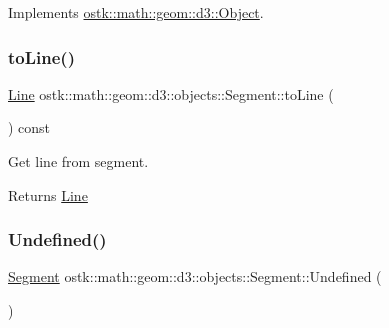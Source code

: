 Implements \hyperlink{classostk_1_1math_1_1geom_1_1d3_1_1_object_ab2a2a782503b97d1cecabdfedc636fce}{ostk\+::math\+::geom\+::d3\+::\+Object}.

\mbox{\label{classostk_1_1math_1_1geom_1_1d3_1_1objects_1_1_segment_a6f9e4f9c67f62d357fae8320dab8d48b}} 
\subsubsection{\texorpdfstring{to\+Line()}{toLine()}}
{\footnotesize\ttfamily \hyperlink{classostk_1_1math_1_1geom_1_1d3_1_1objects_1_1_line}{Line} ostk\+::math\+::geom\+::d3\+::objects\+::\+Segment\+::to\+Line (\begin{DoxyParamCaption}{ }\end{DoxyParamCaption}) const}



Get line from segment. 

\begin{DoxyReturn}{Returns}
\hyperlink{classostk_1_1math_1_1geom_1_1d3_1_1objects_1_1_line}{Line} 
\end{DoxyReturn}
\mbox{\label{classostk_1_1math_1_1geom_1_1d3_1_1objects_1_1_segment_a488c219e6e6a137981df83b9d247f2bf}} 
\subsubsection{\texorpdfstring{Undefined()}{Undefined()}}
{\footnotesize\ttfamily \hyperlink{classostk_1_1math_1_1geom_1_1d3_1_1objects_1_1_segment}{Segment} ostk\+::math\+::geom\+::d3\+::objects\+::\+Segment\+::\+Undefined (\begin{DoxyParamCaption}{ }\end{DoxyParamCaption})\hspace{0.3cm}{\ttfamily [static]}}




